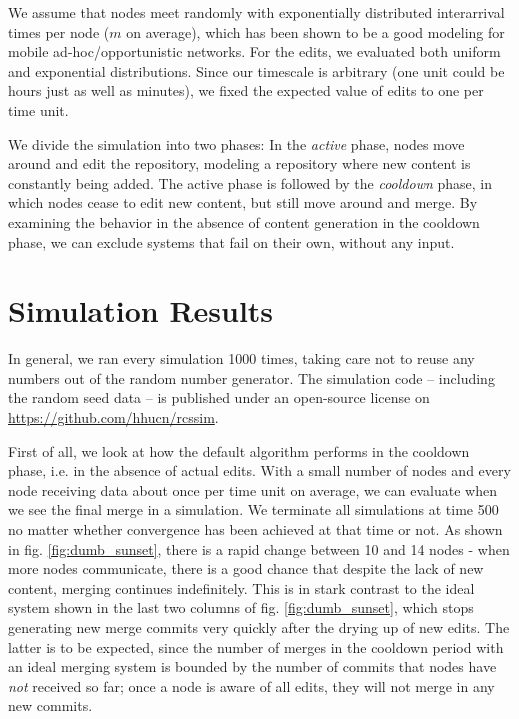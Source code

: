 \documentclass[letterpaper,conference]{IEEEtran}
\begin{document}
We assume that nodes meet randomly with exponentially distributed interarrival times per node ($m$ on average), which has been shown to be a good modeling for mobile ad-hoc/opportunistic networks\cite{groenevelt}. For the edits, we evaluated both uniform and exponential distributions. Since our timescale is arbitrary (one unit could be hours just as well as minutes), we fixed the expected value of edits to one per time unit.

We divide the simulation into two phases: In the \textit{active} phase, nodes move around and edit the repository, modeling a repository where new content is constantly being added. The active phase is followed by the \textit{cooldown} phase, in which nodes cease to edit new content, but still move around and merge. By examining the behavior in the absence of content generation in the cooldown phase, we can exclude systems that fail on their own, without any input.

\section{Simulation Results}

In general, we ran every simulation 1000 times, taking care not to reuse any numbers out of the random number generator. The simulation code -- including the random seed data -- is published under an open-source license on \url{https://github.com/hhucn/rcssim}.

First of all, we look at how the default algorithm performs in the cooldown phase, i.e. in the absence of actual edits. With a small number of nodes and every node receiving data about once per time unit on average, we can evaluate when we see the final merge in a simulation. We terminate all simulations at time 500 no matter whether convergence has been achieved at that time or not. As shown in fig. \ref{fig:dumb_sunset}, there is a rapid change between 10 and 14 nodes - when more nodes communicate, there is a good chance that despite the lack of new content, merging continues indefinitely. This is in stark contrast to the ideal system shown in the last two columns of fig. \ref{fig:dumb_sunset}, which stops generating new merge commits very quickly after the drying up of new edits. The latter is to be expected, since the number of merges in the cooldown period with an ideal merging system is bounded by the number of commits that nodes have \textit{not} received so far; once a node is aware of all edits, they will not merge in any new commits.
\end{document}
